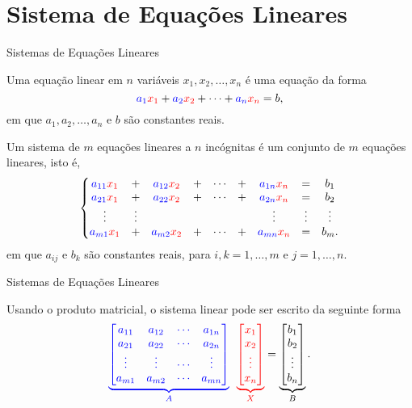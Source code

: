 \section{Sistema de Equações Lineares}


\begin{frame}[label=sistemas]{Sistemas de Equações Lineares}

Uma {\color{blue} equação linear} em {\color{red}$n$} variáveis {\color{red} $x_1,x_2,\ldots, x_n$} é uma equação da forma
\[{\color{blue}a_1}{\color{red}x_1}+{\color{blue}a_2}{\color{red}x_2}+\cdots+{\color{blue}a_n}{\color{red}x_n}=b,\]
em que {\color{blue} $a_1,a_2,\ldots, a_n$} e $b$ são constantes reais.

Um {\color{blue}sistema  de $m$ equações lineares} a {\color{red}$n$ incógnitas} é um conjunto de {\color{blue}$m$} equações lineares, isto é,
\[
\left\{\begin{matrix}
 {\color{blue}a_{11}}{\color{red}x_1} & + &  {\color{blue}a_{12}}{\color{red}x_2} & + & \cdots & + & {\color{blue}a_{1n}}{\color{red}x_n} & = & b_1  \\
 {\color{blue}a_{21}}{\color{red}x_1} & + & {\color{blue}a_{22}}{\color{red}x_2} & + &   \cdots & + & {\color{blue}a_{2n}}{\color{red}x_n} & = & b_2  \\
\vdots & \vdots  & & & &  & \vdots & \vdots & \vdots  \\
 {\color{blue}a_{m1}}{\color{red}x_1} & + & {\color{blue}a_{m2}}{\color{red}x_2} & + &  \cdots  & + &   {\color{blue}a_{mn}}{\color{red}x_n} & = & b_m. 
\end{matrix}
\right.
\]
em que {\color{blue}$a_{ij}$} e $b_k$ são constantes reais, para $i,k=1,\ldots,m$ e $j=1,\ldots,n$.


\end{frame}


\begin{frame}[label=sistemas]{Sistemas de Equações Lineares}

Usando o produto matricial, o {\color{blue}sistema linear} pode ser escrito da seguinte forma
\[
{\color{blue} \underbrace{\begin{bmatrix}
 a_{11}  & a_{12}  & \cdots &  a_{1n}  \\
 a_{21} & a_{22}  & \cdots  & a_{2n} \\
 \vdots & \vdots & \cdots & \vdots \\
 a_{m1} & a_{m2}  & \cdots  & a_{mn} 
\end{bmatrix}}_{A}}\ \
{\color{red}
\underbrace{\begin{bmatrix}
x_1\\ x_2\\ \vdots \\ x_n
\end{bmatrix}}_{X}
}
=
\underbrace{\begin{bmatrix}
b_1 \\ b_2\\ \vdots \\ b_n
\end{bmatrix}}_{B}.
\]

\end{frame}

